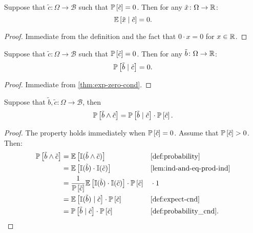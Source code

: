\begin{theorem} \label{thm:exp-zero-cond}
Suppose that $\tilde{c} \colon \Omega \to \mathcal{B}$ such that $\mathbb{P}\left[ \tilde{c} \right] = 0$. Then for any $\tilde{x} \colon \Omega \to \mathbb{R}$:
\[
\mathbb{E} \left[ \tilde{x} \mid \tilde{c} \right] = 0.
\]
\end{theorem}
\begin{proof}
Immediate from the definition and the fact that $0 \cdot  x = 0$ for $x\in \mathbb{R}$.
\end{proof}

\begin{theorem} \label{thm:prob-zero-cond}
Suppose that $\tilde{c} \colon \Omega \to \mathcal{B}$ such that $\mathbb{P}\left[ \tilde{c} \right] = 0$. Then for any $\tilde{b} \colon \Omega \to \mathbb{R}$:
\[
\mathbb{P}\left[ \tilde{b} \mid \tilde{c} \right] = 0.
\]
\end{theorem}
\begin{proof}
Immediate from \cref{thm:exp-zero-cond}.
\end{proof}

\begin{theorem} \label{thm:prob-eq-prob-cond-prob}
Suppose that $\tilde{b}, \tilde{c} \colon \Omega \to \mathcal{B}$, then
\[
\mathbb{P} \left[ \tilde{b} \wedge \tilde{c} \right] 
=
\mathbb{P} \left[ \tilde{b} \mid \tilde{c} \right] \cdot \mathbb{P} \left[ \tilde{c} \right].
\]
\end{theorem}
\begin{proof} The property holds immediately when $\mathbb{P} \left[ \tilde{c} \right] = 0$. Assume that $\mathbb{P} \left[ \tilde{c} \right] > 0$. Then:
  \begin{align*}
    \PP \left[ \tilde{b} \wedge \tilde{c} \right]
    &= \E \left[ \I(\tilde{b} \wedge \tilde{c}) \right] && \text{\cref{def:probability}} \\
    &= \E \left[ \I(\tilde{b}) \cdot \I(\tilde{c}) \right] && \text{\cref{lem:ind-and-eq-prod-ind}}\\
    &= \frac{1}{\PP \left[ \tilde{c} \right]}\E \left[ \I(\tilde{b}) \cdot \I(\tilde{c}) \right] \cdot \PP \left[ \tilde{c} \right] && \cdot 1 \\
    &= \E \left[ \I(\tilde{b}) \mid \tilde{c} \right] \cdot \PP \left[ \tilde{c} \right]
    && \text{\cref{def:expect-cnd}} \\
    &= \PP \left[ \tilde{b} \mid \tilde{c} \right] \cdot \PP \left[ \tilde{c} \right] && \text{\cref{def:probability_cnd}}.
  \end{align*}
\end{proof}


